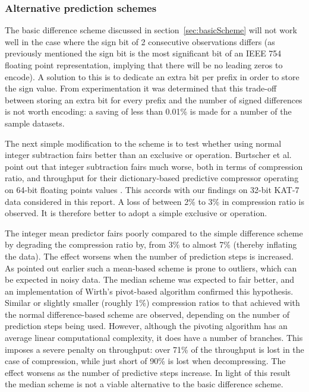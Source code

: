   \subsubsection{Alternative prediction schemes}
  The basic difference scheme discussed in section~\ref{sec:basicScheme} will not work well in the case where the sign bit of 2 consecutive observations differs (as previously mentioned the sign bit is the most significant bit of an IEEE 754 
  floating point representation, implying that there will be no leading zeros to encode). A solution to this is to dedicate an extra bit per prefix in order to store the sign value. From experimentation it was determined that
  this trade-off between storing an extra bit for every prefix and the number of signed differences is not worth encoding: a saving of less than 0.01\% is made for a number of the sample datasets. 
  
  The next simple modification to the scheme is to test whether using normal integer subtraction fairs better than an exclusive or operation. Burtscher et al. point out that integer subtraction fairs much worse, both in terms of
  compression ratio, and throughput for their dictionary-based predictive compressor operating on 64-bit floating points values \cite{4589203}. This accords with our findings on 32-bit KAT-7 data considered in this report. 
  A loss of between 2\% to 3\% in compression ratio is observed. It is therefore better to adopt a simple exclusive or operation.
  
  The integer mean predictor fairs poorly compared to the simple difference scheme by degrading the compression ratio by, from 3\% to almost 7\% (thereby inflating the data). The effect worsens when the number of prediction 
  steps is increased. As pointed out earlier such a mean-based scheme is prone to outliers, which can be expected in noisy data. The median scheme was expected to fair better, and an implementation of Wirth's pivot-based  
  algorithm confirmed this hypothesis. Similar or slightly smaller (roughly 1\%) compression ratios to that achieved with the normal difference-based scheme are observed, depending on the number of prediction steps being used. 
  However, although the pivoting algorithm has an average linear computational complexity, it does have a number of branches. This imposes a severe penalty on throughput: over 
  71\% of the throughput is lost in the case of compression, while just short of 90\% is lost when decompressing. The effect worsens as the number of predictive steps increase. In light of this result the median 
  scheme is not a viable alternative to the basic difference scheme.
  
